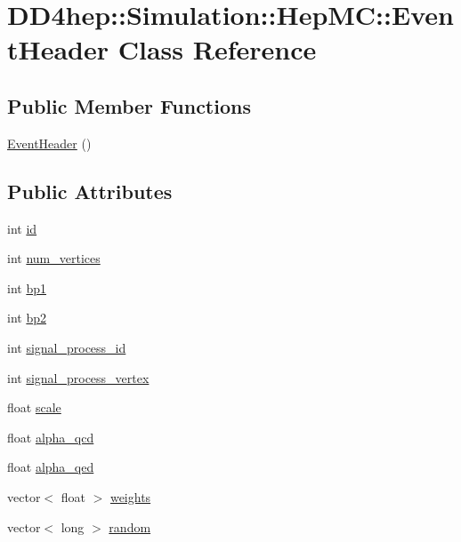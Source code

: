 \hypertarget{class_d_d4hep_1_1_simulation_1_1_hep_m_c_1_1_event_header}{}\section{D\+D4hep\+:\+:Simulation\+:\+:Hep\+MC\+:\+:Event\+Header Class Reference}
\label{class_d_d4hep_1_1_simulation_1_1_hep_m_c_1_1_event_header}
\subsection*{Public Member Functions}
\begin{DoxyCompactItemize}
\item 
\hyperlink{class_d_d4hep_1_1_simulation_1_1_hep_m_c_1_1_event_header_a7e32471a0f8b744e116a1ae9d0d7e620}{Event\+Header} ()
\end{DoxyCompactItemize}
\subsection*{Public Attributes}
\begin{DoxyCompactItemize}
\item 
int \hyperlink{class_d_d4hep_1_1_simulation_1_1_hep_m_c_1_1_event_header_a221f01143ced151a262de45ca6749cc4}{id}
\item 
int \hyperlink{class_d_d4hep_1_1_simulation_1_1_hep_m_c_1_1_event_header_a83354fc882a2fb46a053a524a7145eb1}{num\+\_\+vertices}
\item 
int \hyperlink{class_d_d4hep_1_1_simulation_1_1_hep_m_c_1_1_event_header_a5c029c436a958d9903c9296823ed2195}{bp1}
\item 
int \hyperlink{class_d_d4hep_1_1_simulation_1_1_hep_m_c_1_1_event_header_a4b3d20b78f49d539c6487d2a5eeb844c}{bp2}
\item 
int \hyperlink{class_d_d4hep_1_1_simulation_1_1_hep_m_c_1_1_event_header_a339a52131b423a70529a66bae821906b}{signal\+\_\+process\+\_\+id}
\item 
int \hyperlink{class_d_d4hep_1_1_simulation_1_1_hep_m_c_1_1_event_header_a22408536166a5457c2380e3a06c3ae0c}{signal\+\_\+process\+\_\+vertex}
\item 
float \hyperlink{class_d_d4hep_1_1_simulation_1_1_hep_m_c_1_1_event_header_a68ba7289f036ebb18a5ae1d6c602bfa8}{scale}
\item 
float \hyperlink{class_d_d4hep_1_1_simulation_1_1_hep_m_c_1_1_event_header_aa21d0c781608de75c13594b41011c043}{alpha\+\_\+qcd}
\item 
float \hyperlink{class_d_d4hep_1_1_simulation_1_1_hep_m_c_1_1_event_header_a6ca0fb3012c13d65f7bc3ea095d41a73}{alpha\+\_\+qed}
\item 
vector$<$ float $>$ \hyperlink{class_d_d4hep_1_1_simulation_1_1_hep_m_c_1_1_event_header_a21a1d471bc6ce75aedfdb9be2db5b0b2}{weights}
\item 
vector$<$ long $>$ \hyperlink{class_d_d4hep_1_1_simulation_1_1_hep_m_c_1_1_event_header_af705e3b582d71aef2b82d27e1056952b}{random}
\end{DoxyCompactItemize}



